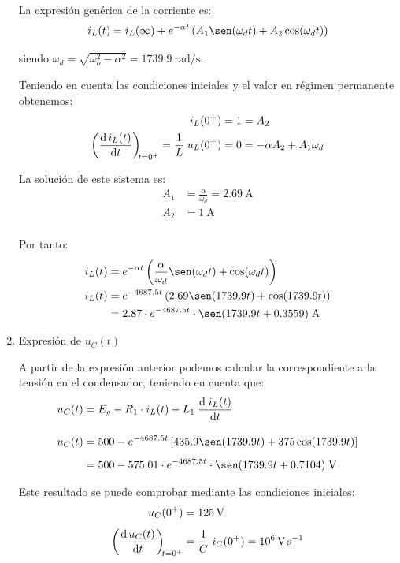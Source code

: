 \begin{enumerate}
  La expresión genérica de la corriente es:
  \[
    i_L(t) = i_L(\infty) + e^{-\alpha t} \left(A_1 \sen(\omega_d t) + A_2 \cos(\omega_d t)\right)
  \]

  siendo $\omega_d = \sqrt{\omega_o^2 - \alpha^2} = \SI{1739.9}{\radian\per\second}$.

  \vspace{3mm}
  Teniendo en cuenta las condiciones iniciales y el valor en régimen permanente obtenemos:
  \begin{align*}
    i_L(0^+) = 1 &= A_2\\
    \diff{\, i_L(t)}{t}[t = 0^+] = \frac{1}{L} \; u_L(0^+) = 0 &= -\alpha A_2 + A_1 \omega_d
  \end{align*}

  La solución de este sistema es:
  \begin{align*}
    A_1 &= \frac{\alpha}{\omega_d} = \qty{2.69}\ampere\\
    A_2 &= \qty{1}{\ampere}\\
  \end{align*}
  
  Por tanto:
  \begin{align*}
        i_L(t) &= e^{-\alpha t} \left(\frac{\alpha}{\omega_d} \sen(\omega_d t) + \cos(\omega_d t)\right)\\
    i_L(t) &= e^{-4687.5 t} \left(2.69 \sen(1739.9t) + \cos(1739.9 t)\right)\\
               &= 2.87 \cdot e^{-4687.5 t} \cdot \sen(1739.9t + 0.3559) \;\si{\ampere}
  \end{align*}

\vspace{2mm}

\item Expresión de $u_C(t)$

  A partir de la expresión anterior podemos calcular la correspondiente a la tensión en el condensador, teniendo en cuenta que:
  \begin{align*}
    u_C(t) &= E_g - R_1 \cdot i_L(t) - L_1 \; \diff{\; i_L(t)}{t} \\[10pt]
    u_C(t) &= 500 - e^{-4687.5 t} \left[435.9 \sen(1739.9t) + 375 \cos(1739.9 t)\right]\\[5pt]
           &= 500 - 575.01 \cdot e^{-4687.5 t} \cdot  \sen(1739.9t + 0.7104)\;\si{\volt}
  \end{align*}

  Este resultado se puede comprobar mediante las condiciones iniciales:
    \begin{align*}
    u_C(0^+) &= \qty{125}{\volt}\\[4pt]
    \diff{\, u_C(t)}{t}[t = 0^+] &= \frac{1}{C} \; i_C(0^+) = 10^6\,\si{\volt\per\second}\\
  \end{align*}

\end{enumerate}



